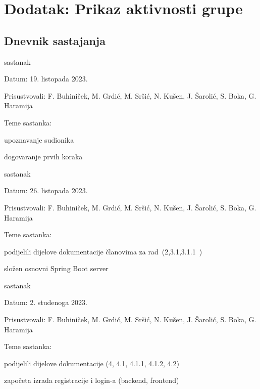 \chapter*{Dodatak: Prikaz aktivnosti grupe}
		
		\section*{Dnevnik sastajanja}
		
		
		\begin{packed_enum}
			\item  sastanak
			
			\item[] \begin{packed_item}
				\item Datum: 19. listopada 2023.
				\item Prisustvovali: F. Buhiniček, M. Grdić, M. Sršić, N. Kušen, J. Šarolić, S. Boka, G. Haramija
				\item Teme sastanka:
				\begin{packed_item}
					\item  upoznavanje sudionika 
					\item  dogovaranje prvih koraka
				\end{packed_item}
			\end{packed_item}
			
			\item  sastanak
			\item[] \begin{packed_item}
				\item Datum: 26. listopada 2023.
				\item Prisustvovali: F. Buhiniček, M. Grdić, M. Sršić, N. Kušen, J. Šarolić, S. Boka, G. Haramija
				\item Teme sastanka:
				\begin{packed_item}
					\item  podijelili dijelove dokumentacije članovima za rad (2,3.1,3.1.1 )
					\item  složen osnovni Spring Boot server
				\end{packed_item}
			\end{packed_item}
			
						\item  sastanak
			\item[] \begin{packed_item}
				\item Datum:  2. studenoga 2023.
				\item Prisustvovali: F. Buhiniček, M. Grdić, M. Sršić, N. Kušen, J. Šarolić, S. Boka, G. Haramija
				\item Teme sastanka:
				\begin{packed_item}
					\item  podijelili dijelove dokumentacije (4, 4.1, 4.1.1, 4.1.2, 4.2)
					\item  započeta izrada registracije i login-a (backend, frontend)
				\end{packed_item}
			\end{packed_item}
			

\end{packed_enum}
